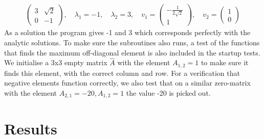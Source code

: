 \documentclass[a4paper,11pt]{article}
\begin{document}
{\begin{align}
\begin{pmatrix}
3 & \sqrt{2} \\
0 & -1 
\end{pmatrix}
, \quad \lambda_1 = -1, \quad \lambda_2 = 3, \quad v_1 = \begin{pmatrix}
-\frac{1}{2\sqrt{2}} \\
1
\end{pmatrix}, \quad v_2 = \begin{pmatrix}
1 \\
0
\end{pmatrix}
\end{align}
As a solution the program gives -1 and 3 which corresponds perfectly with the analytic solutions. To make sure the subroutines also runs, a test of the functions that finds the maximum off-diagonal element is also included in the startup tests. We initialise a 3x3 empty matrix $\hat{A}$ with the element $A_{1,2}=1$ to make sure it finds this element, with the correct column and row. For a verification that negative elements function correctly, we also test that on a similar zero-matrix with the element $A_{2,1}=-20, A_{1,2}=1$ the value -20 is picked out. 






\section*{Results}
}
\end{document}
